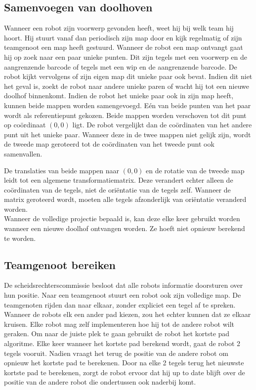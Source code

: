 \documentclass[tt3]{penoverslag}
\begin{document}
\subsection{Samenvoegen van doolhoven}
\label{ssec:AlgoMappen}
Wanneer een robot zijn voorwerp gevonden heeft, weet hij bij welk team hij hoort. Hij stuurt vanaf dan periodisch zijn map door en kijk regelmatig of zijn teamgenoot een map heeft gestuurd.
Wanneer de robot een map ontvangt gaat hij op zoek naar een paar unieke punten. Dit zijn tegels met een voorwerp en de aangrenzende barcode of tegels met een wip en de aangrenzende barcode. De robot kijkt vervolgens of zijn eigen map dit unieke paar ook bevat. Indien dit niet het geval is, zoekt de robot naar andere unieke paren of wacht hij tot een nieuwe doolhof binnenkomt.
Indien de robot het unieke paar ook in zijn map heeft, kunnen beide mappen worden samengevoegd. E\'en van beide punten van het paar wordt als referentiepunt gekozen. Beide mappen worden verschoven tot dit punt op co\"ordinaat $(0,0)$ ligt. De robot vergelijkt dan de co\"ordinaten van het andere punt uit het unieke paar. Wanneer deze in de twee mappen niet gelijk zijn, wordt de tweede map geroteerd tot de co\"ordinaten van het tweede punt ook samenvallen.

De translaties van beide mappen naar $(0,0)$ en de rotatie van de tweede map leidt tot een algemene transformatiematrix. Deze verandert echter alleen de co\"ordinaten van de tegels, niet de ori\"entatie van de tegels zelf. Wanneer de matrix geroteerd wordt, moeten alle tegels afzonderlijk van ori\"entatie veranderd worden.\\

Wanneer de volledige projectie bepaald is, kan deze elke keer gebruikt worden wanneer een nieuwe doolhof ontvangen worden. Ze hoeft niet opnieuw berekend te worden.

\subsection{Teamgenoot bereiken}
\label{ssec:AlgoAndereRobot}

De scheidsrechterscommissie besloot dat alle robots informatie doorsturen over hun positie. Naar een teamgenoot stuurt een robot ook zijn volledige map. De teamgenoten rijden dan naar elkaar, zonder expliciet een tegel af te spreken. Wanneer de robots elk een ander pad kiezen, zou het echter kunnen dat ze elkaar kruisen. Elke robot mag zelf implementeren hoe hij tot de andere robot wilt geraken.
Om naar de juiste plek te gaan gebruikt de robot het kortste pad algoritme. Elke keer wanneer het kortste pad berekend wordt, gaat de robot 2 tegels vooruit. Nadien vraagt het terug de positie van de andere robot om opnieuw het kortste pad te berekenen. Door na elke 2 tegels terug het nieuwste kortste pad te berekenen, zorgt de robot ervoor dat hij up to date blijft over de positie van de andere robot die ondertussen ook naderbij komt.
\end{document}
